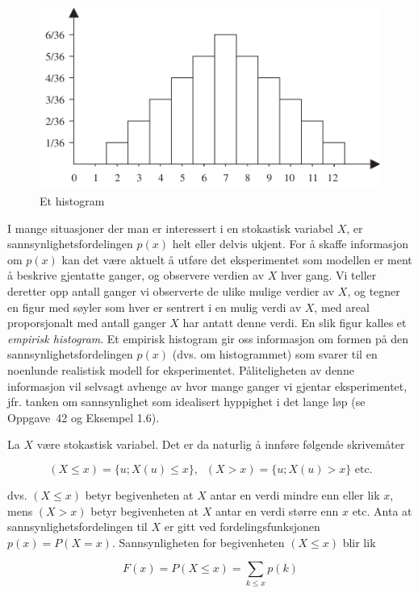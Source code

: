 \begin{figure}[ht]
\centering
\includegraphics[scale=0.7]{figurer/fig5_2.pdf} 
\caption{Et histogram}
	\label{fig:histogram_k5}
\end{figure}

I mange situasjoner der man er interessert i en stokastisk
variabel $X$, er sannsynlighetsfordelingen $p(x)$ helt eller
delvis ukjent. For å skaffe informasjon om $p(x)$ kan det være
aktuelt å utføre det eksperimentet som modellen er ment å
beskrive gjentatte ganger, og observere verdien av $X$ hver gang.
Vi teller deretter opp antall ganger vi observerte de ulike
mulige verdier av $X$, og tegner en figur med søyler som hver er
sentrert i en mulig verdi av $X$, med areal proporsjonalt med
antall ganger $X$ har antatt denne verdi. En slik figur kalles et
{\em empirisk histogram}. Et empirisk histogram gir oss
informasjon om formen på den sannsynlighetsfordelingen $p(x)$
(dvs. om histogrammet) som svarer til en noenlunde realistisk
modell for eksperimentet. Påliteligheten av denne informasjon vil
selvsagt avhenge av hvor mange ganger vi gjentar eksperimentet,
jfr. tanken om sannsynlighet som idealisert hyppighet i det lange
løp (se Oppgave~42 og Eksempel 1.6).

La $X$ være stokastisk variabel. Det er da naturlig å innføre
følgende skrivemåter

\[ (X \leq x)=\{u;X(u) \leq x\}, \; \; (X>x)=\{u;X(u)>x\}  \mbox{\ \ etc.} \]

\noindent dvs. $(X \leq x)$ betyr begivenheten at $X$ antar en verdi
mindre enn eller lik $x$, mens $(X>x)$ betyr begivenheten at $X$
antar en verdi større enn $x$ etc. Anta at sannsynlighetsfordelingen
til $X$ er gitt ved fordelingsfunksjonen $p(x)=P(X=x)$.
Sannsynligheten for begivenheten $(X \leq x)$ blir lik

\[ F(x)=P(X \leq x)=\sum_{k \leq x}p(k) \]

